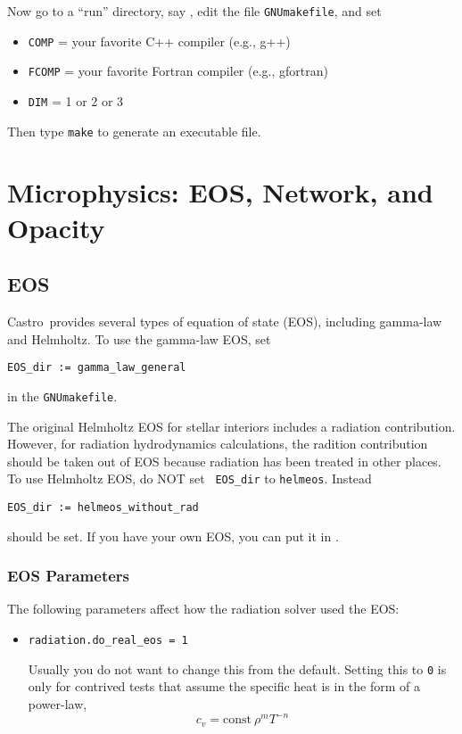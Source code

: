\documentclass[11pt,letterpaper]{article}
\newcommand{\castro}{{\sf Castro}}
\begin{document}
Now go to a ``run'' directory, say
{\tt{}},
edit the file {\tt GNUmakefile}, and set
\begin{itemize}
\item {\tt COMP} = your favorite C++ compiler (e.g., g++)
\item {\tt FCOMP} = your favorite Fortran compiler (e.g., gfortran)
\item {\tt DIM}   = 1 or 2 or 3
\end{itemize}
Then type {\tt make} to generate an executable file.

\section{Microphysics: EOS, Network, and Opacity}

\subsection{EOS}

\castro\ provides several types of equation of state (EOS), including
gamma-law and Helmholtz.  To use the gamma-law EOS, set
\begin{verbatim}
EOS_dir := gamma_law_general
\end{verbatim}
in the {\tt GNUmakefile}.

The original Helmholtz EOS for stellar interiors includes a radiation
contribution.  However, for radiation hydrodynamics calculations, the
radition contribution should be taken out of EOS because radiation has
been treated in other places.  To use Helmholtz EOS, do NOT set {\tt
  EOS\_dir} to {\tt helmeos}.  Instead
\begin{verbatim}
EOS_dir := helmeos_without_rad
\end{verbatim}
should be set.  If you have your own EOS, you can put it in
{\tt{}}.

\subsubsection{EOS Parameters}

The following parameters affect how the radiation solver used the EOS:
\begin{itemize}
  \item {\tt radiation.do\_real\_eos = 1}

    Usually you do not want to change this from the default.  Setting
    this to {\tt 0} is only for contrived tests that assume the
    specific heat is in the form of a power-law,
    \begin{equation}
      c_v = \mathrm{const}\ \rho^m T^{-n}
    \end{equation}

\end{itemize}
  
\end{document}
